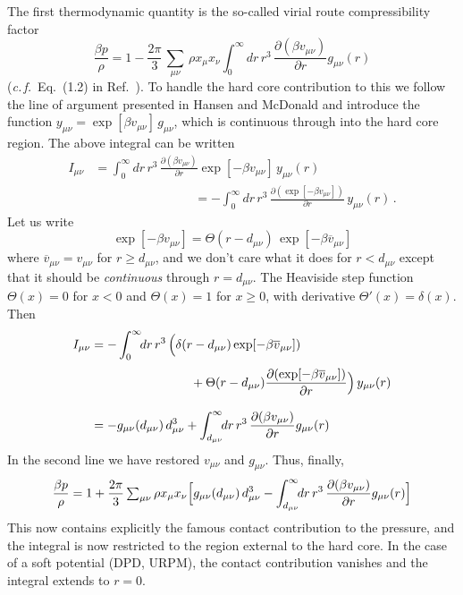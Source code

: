 \documentclass[12pt,a4paper]{article}
\newcommand{\latin}[1]{\emph{#1}}
\newcommand{\cf}{\latin{c.\,f.}}
\newcommand{\Refcite}[1]{Ref.~\cite{#1}}
\begin{document}
The first thermodynamic quantity is the so-called virial route
compressibility factor
%
\begin{equation}
\frac{\beta p}{\rho}=1-\frac{2\pi}{3}\,{\textstyle \sum_{\mu\nu}}\,
\rho x_\mu x_\nu \int_0^\infty\!\!dr\,r^3\,\frac{\partial(\beta
  v_{\mu\nu})}{\partial r} g_{\mu\nu}(r)
\end{equation}
%
(\cf\ Eq.~(1.2) in \Refcite{Vrbka09}).  To handle the hard core
contribution to this we follow the line of argument presented in
Hansen and McDonald \cite{HM06} and introduce the function
$y_{\mu\nu}=\exp[\beta v_{\mu\nu}]\,g_{\mu\nu}$, which is continuous
through into the hard core region.  The above integral can be written
%
\begin{equation}
\begin{split}
I_{\mu\nu}&=\int_0^\infty\!\!dr\,r^3\,\frac{\partial(\beta
  v_{\mu\nu})}{\partial r} \exp[-\beta v_{\mu\nu}]\,y_{\mu\nu}(r)\\[6pt]
&{}\hspace{8em}{}=-\int_0^\infty\!\!dr\,r^3\,\frac{\partial(\exp[-\beta
    v_{\mu\nu}])}{\partial r} \,y_{\mu\nu}(r)\,.
\end{split}
\end{equation}
%
Let us write
%
\begin{equation}
\exp[-\beta v_{\mu\nu}]=\Theta(r-d_{\mu\nu})\,\exp[-\beta \overline v_{\mu\nu}]
\end{equation}
%
where $\overline v_{\mu\nu}=v_{\mu\nu}$ for $r\ge d_{\mu\nu}$, and we
don't care what it does for $r<d_{\mu\nu}$ except that it should be
\emph{continuous} through $r=d_{\mu\nu}$.  The Heaviside step function
$\Theta(x)=0$ for $x<0$ and $\Theta(x)=1$ for $x\ge0$, with derivative
$\Theta'(x)=\delta(x)$. Then
\begin{equation}
\begin{split}
I_{\mu\nu}&=-\int_0^\infty\!\!dr\,r^3\,\Bigl(\delta(r-d_{\mu\nu})
\exp[-\beta \overline v_{\mu\nu}])\\[3pt]
&{}\hspace{8em}{}+\Theta(r-d_{\mu\nu})
\frac{\partial(\exp[-\beta
    \overline v_{\mu\nu}])}{\partial r} \Bigr)\,y_{\mu\nu}(r)\\[9pt]
&=-g_{\mu\nu}(d_{\mu\nu})\,d_{\mu\nu}^3+
\int_{d_{\mu\nu}}^\infty\!\!dr\,r^3\,\frac{\partial(\beta
  v_{\mu\nu})}{\partial r} g_{\mu\nu}(r)
\end{split}
\end{equation}
%
In the second line we have restored $v_{\mu\nu}$ and $g_{\mu\nu}$. 
Thus, finally,
%
\begin{equation}
\frac{\beta p}{\rho}=1
+\frac{2\pi}{3}\,{\textstyle \sum_{\mu\nu}}\,\rho x_\mu x_\nu 
\Bigl[g_{\mu\nu}(d_{\mu\nu})\,d_{\mu\nu}^3 
- \int_{d_{\mu\nu}}^\infty\!\!dr\,r^3\,\frac{\partial(\beta
  v_{\mu\nu})}{\partial r} g_{\mu\nu}(r)\Bigr]
\end{equation}
%
This now contains explicitly the famous contact contribution to the
pressure, and the integral is now restricted to the region external to
the hard core.  In the case of a soft potential (DPD, URPM), the
contact contribution vanishes and the integral extends to $r=0$.
\end{document}
